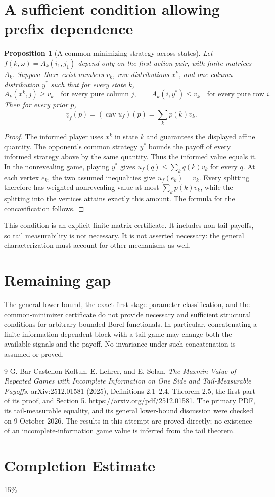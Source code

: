 \documentclass[11pt]{article}
\newtheorem{proposition}[theorem]{Proposition}
\theoremstyle{definition}
\DeclareMathOperator{\cav}{cav}
\begin{document}
\section*{A sufficient condition allowing prefix dependence}
\begin{proposition}[A common minimizing strategy across states]
Let $f(k,\omega)=A_k(i_1,j_1)$ depend only on the first action pair, with finite matrices $A_k$. Suppose there exist numbers $v_k$, row distributions $x^k$, and one column distribution $y^*$ such that for every state $k$,
\[
 A_k(x^k,j)\ge v_k\quad\text{for every pure column }j,
 \qquad
 A_k(i,y^*)\le v_k\quad\text{for every pure row }i.
\]
Then for every prior $p$,
\[
 \underline v_f(p)=(\cav u_f)(p)=\sum_k p(k)v_k.
\]
\end{proposition}
\begin{proof}
The informed player uses $x^k$ in state $k$ and guarantees the displayed affine quantity. The opponent's common strategy $y^*$ bounds the payoff of every informed strategy above by the same quantity. Thus the informed value equals it. In the nonrevealing game, playing $y^*$ gives $u_f(q)\le\sum_kq(k)v_k$ for every $q$. At each vertex $e_k$, the two assumed inequalities give $u_f(e_k)=v_k$. Every splitting therefore has weighted nonrevealing value at most $\sum_kp(k)v_k$, while the splitting into the vertices attains exactly this amount. The formula for the concavification follows.
\end{proof}

This condition is an explicit finite matrix certificate. It includes non-tail payoffs, so tail measurability is not necessary. It is not asserted necessary: the general characterization must account for other mechanisms as well.

\section*{Remaining gap}
The general lower bound, the exact first-stage parameter classification, and the common-minimizer certificate do not provide necessary and sufficient structural conditions for arbitrary bounded Borel functionals. In particular, concatenating a finite information-dependent block with a tail game may change both the available signals and the payoff. No invariance under such concatenation is assumed or proved.

\begin{thebibliography}{9}
 G. Bar Castellon Koltun, E. Lehrer, and E. Solan, \emph{The Maxmin Value of Repeated Games with Incomplete Information on One Side and Tail-Measurable Payoffs}, arXiv:2512.01581 (2025), Definitions 2.1--2.4, Theorem 2.5, the first part of its proof, and Section 5. \url{https://arxiv.org/pdf/2512.01581}. The primary PDF, its tail-measurable equality, and its general lower-bound discussion were checked on 9 October 2026. The results in this attempt are proved directly; no existence of an incomplete-information game value is inferred from the tail theorem.
\end{thebibliography}

\section{Completion Estimate}
15\%
\end{document}
